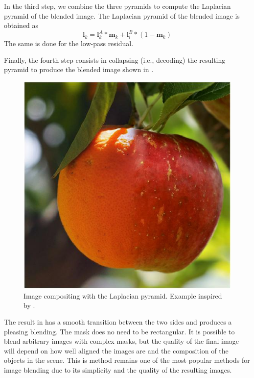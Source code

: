 In the third step, we combine the three pyramids to compute the Laplacian pyramid of the blended image. The Laplacian pyramid of the blended image is obtained as 
\begin{equation}
\mathbf{l}_k = \mathbf{l}_k^A * \mathbf{m}_k + \mathbf{l}_i^B * (1-\mathbf{m}_k)
\end{equation}
The same is done for the low-pass residual. 

Finally, the fourth step consists in collapsing (i.e., decoding) the resulting pyramid to produce the blended image shown in \fig{\ref{fig:appleorange}}.

\begin{figure}[h!]
\centerline{
\includegraphics[width=0.35\linewidth]{figures/pyramids/apple_orange_laplacian_8levels.jpg}
}
\caption{Image compositing with the Laplacian pyramid. Example inspired by \cite{Burt83}.}
\label{fig:appleorange}
\end{figure}

The result in \fig{\ref{fig:appleorange}} has a smooth transition between the two sides and produces a pleasing blending. The mask does no need to be rectangular. It is possible to blend arbitrary images with complex masks, but the quality of the final image will depend on how well aligned the images are and the composition of the objects in the scene. 
This is method remains one of the most popular methods for image blending due to its simplicity and the quality of the resulting images. 

%
%


